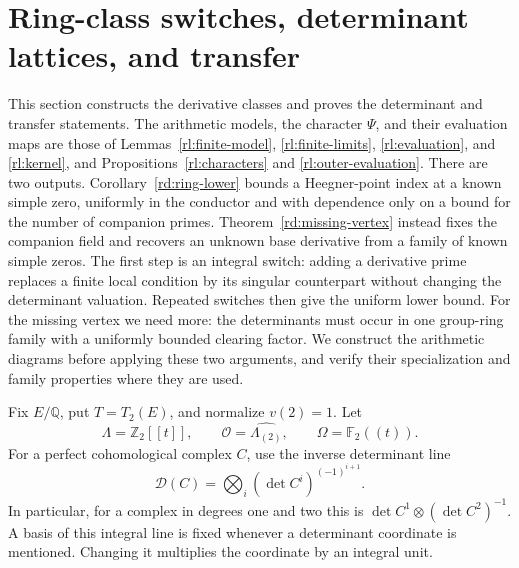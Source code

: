 \section{Ring-class switches, determinant lattices, and transfer}
\label{rd:section}

This section constructs the derivative classes and proves the determinant
and transfer statements.  The arithmetic models, the character \(\Psi\), and their
evaluation maps are those of Lemmas~\ref{rl:finite-model},
\ref{rl:finite-limits}, \ref{rl:evaluation}, and \ref{rl:kernel},
and Propositions~\ref{rl:characters} and \ref{rl:outer-evaluation}.
There are two outputs.  Corollary~\ref{rd:ring-lower} bounds a
Heegner-point index at a known simple zero, uniformly in the conductor
and with dependence only on a bound for the number of companion primes.
Theorem~\ref{rd:missing-vertex} instead fixes the companion field and
recovers an unknown base derivative from a family of known simple zeros.
The first step is an integral switch: adding a derivative prime replaces
a finite local condition by its singular counterpart without changing
the determinant valuation.  Repeated switches then give the uniform
lower bound.  For the missing vertex we need more: the determinants
must occur in one group-ring family with a uniformly bounded clearing
factor.  We construct the arithmetic diagrams before applying these two
arguments, and verify their specialization and family properties where
they are used.

Fix \(E/\mathbb Q\), put \(T=T_2(E)\), and normalize \(v(2)=1\).  Let
\[
 \Lambda=\mathbb Z_2[[t]],\qquad
 \mathcal O=\widehat{\Lambda_{(2)}},\qquad
 \Omega=\mathbb F_2((t)).
\]
For a perfect cohomological complex \(C\), use the inverse determinant line
\begin{equation}
 \mathcal D(C)=\bigotimes_i(\det C^i)^{(-1)^{i+1}}.
 \label{rd:det-convention}
\end{equation}
In particular, for a complex in degrees one and two this is
\(\det C^1\otimes(\det C^2)^{-1}\).  A basis of this integral line is fixed
whenever a determinant coordinate is mentioned.  Changing it multiplies
the coordinate by an integral unit.

